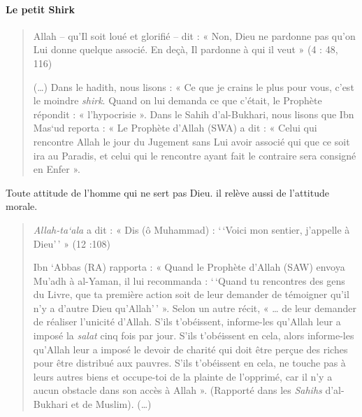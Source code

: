 \paragraph{Le petit Shirk} 
\begin{quote}
Allah -- qu'Il soit loué et glorifié -- dit : « Non, Dieu ne pardonne
pas qu'on Lui donne quelque associé. En deçà, Il pardonne à qui il veut
» (4 : 48, 116)

(\ldots) Dans le hadith, nous lisons : « Ce que je crains le plus pour
vous, c'est le moindre \emph{shirk}. Quand on lui demanda ce que
c'était, le Prophète répondit : « l'hypocrisie ». Dans le Sahih
d'al-Bukhari, nous lisons que Ibn Mas`ud reporta : « Le Prophète d'Allah
(SWA) a dit : « Celui qui rencontre Allah le jour du Jugement sans Lui
avoir associé qui que ce soit ira au Paradis, et celui qui le rencontre
ayant fait le contraire sera consigné en Enfer ».
\end{quote}
\begin{Def}
Toute attitude de l'homme qui ne sert pas Dieu. il relève aussi de l'attitude morale.
\end{Def}

\begin{Ex}

\begin{quote}
\emph{Allah-ta`ala} a dit : « Dis (ô Muhammad) : `\,`Voici mon sentier,
j'appelle à Dieu'\,' » (12 :108)

Ibn `Abbas (RA) rapporta : « Quand le Prophète d'Allah (SAW) envoya
Mu'adh à al-Yaman, il lui recommanda : `\,`Quand tu rencontres des gens
du Livre, que ta première action soit de leur demander de témoigner
qu'il n'y a d'autre Dieu qu'Allah'\,' ». Selon un autre récit, «
\ldots{} de leur demander de réaliser l'unicité d'Allah. S'ils
t'obéissent, informe-les qu'Allah leur a imposé la \emph{salat} cinq
fois par jour. S'ils t'obéissent en cela, alors informe-les qu'Allah
leur a imposé le devoir de charité qui doit être perçue des riches pour
être distribué aux pauvres. S'ils t'obéissent en cela, ne touche pas à
leurs autres biens et occupe-toi de la plainte de l'opprimé, car il n'y a aucun obstacle dans son accès à Allah ».
(Rapporté dans les \emph{Sahihs} d'al-Bukhari et de Muslim). (\ldots)
\end{quote}
\end{Ex}



